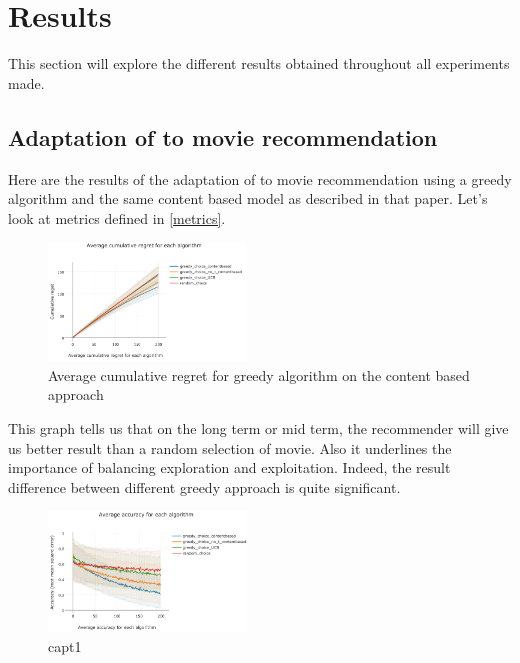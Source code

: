 \documentclass[letterpaper]{article}
\begin{document}
\section{Results} \label{results}

This section will explore the different results obtained throughout all experiments made.

\subsection{Adaptation of \cite{main} to movie recommendation}

Here are the results of the adaptation of \cite{main} to movie recommendation using a greedy algorithm and the same content based model as described in that paper. Let's look at metrics defined in \ref{metrics}.

\begin{figure}[H]
\begin{center}
\includegraphics[width=0.47\textwidth]{img/greedy0.png}
\caption{Average cumulative regret for greedy algorithm on the content based approach}
\label{greedy0}
\end{center}
\end{figure}

This graph tells us that on the long term or mid term, the recommender will give us better result than a random selection of movie. Also it underlines the importance of balancing exploration and exploitation. Indeed, the result difference between different greedy approach is quite significant.

\begin{figure}[H]
\begin{center}
\includegraphics[width=0.47\textwidth]{img/greedy1.png}
\caption{capt1}
\label{greedy1}
\end{center}
\end{figure}
\end{document}
